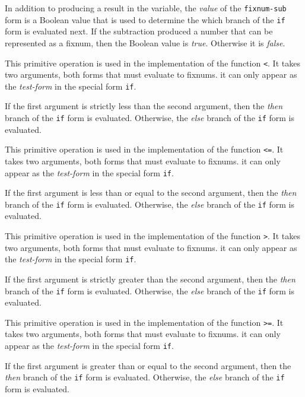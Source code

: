 In addition to producing a result in the variable, the \emph{value}
of the \texttt{fixnum-sub} form is a Boolean value that is used to
determine the which branch of the \texttt{if} form is evaluated next.
If the subtraction produced a number that can be represented as a
fixnum, then the Boolean value is \emph{true}.  Otherwise it is
\emph{false}.


This primitive operation is used in the implementation of the
\commonlisp{} function \texttt{<}.  It takes two arguments, both forms
that must evaluate to fixnums.  it can only appear as the
\emph{test-form} in the special form \texttt{if}.

If the first argument is strictly less than the second argument, then
the \emph{then} branch of the \texttt{if} form is evaluated.
Otherwise, the \emph{else} branch of the \texttt{if} form is
evaluated.


This primitive operation is used in the implementation of the
\commonlisp{} function \texttt{<=}.  It takes two arguments, both
forms that must evaluate to fixnums.  it can only appear as the
\emph{test-form} in the special form \texttt{if}.

If the first argument is less than or equal to the second argument,
then the \emph{then} branch of the \texttt{if} form is evaluated.
Otherwise, the \emph{else} branch of the \texttt{if} form is
evaluated.


This primitive operation is used in the implementation of the
\commonlisp{} function \texttt{>}.  It takes two arguments, both
forms that must evaluate to fixnums.  it can only appear as the
\emph{test-form} in the special form \texttt{if}.

If the first argument is strictly greater than the second argument,
then the \emph{then} branch of the \texttt{if} form is evaluated.
Otherwise, the \emph{else} branch of the \texttt{if} form is
evaluated.


This primitive operation is used in the implementation of the
\commonlisp{} function \texttt{>=}.  It takes two arguments, both
forms that must evaluate to fixnums.  it can only appear as the
\emph{test-form} in the special form \texttt{if}.

If the first argument is greater than or equal to the second argument,
then the \emph{then} branch of the \texttt{if} form is evaluated.
Otherwise, the \emph{else} branch of the \texttt{if} form is
evaluated.

